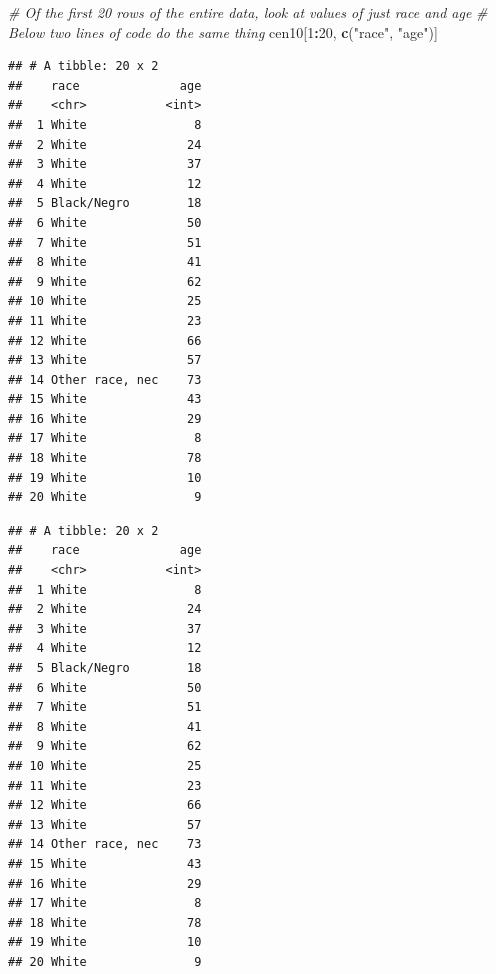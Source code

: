 \documentclass[]{book}
\newenvironment{Shaded}{\begin{snugshade}}{\end{snugshade}}
\newcommand{\CommentTok}[1]{\textcolor[rgb]{0.56,0.35,0.01}{\textit{#1}}}
\newcommand{\DecValTok}[1]{\textcolor[rgb]{0.00,0.00,0.81}{#1}}
\newcommand{\KeywordTok}[1]{\textcolor[rgb]{0.13,0.29,0.53}{\textbf{#1}}}
\newcommand{\NormalTok}[1]{#1}
\newcommand{\OperatorTok}[1]{\textcolor[rgb]{0.81,0.36,0.00}{\textbf{#1}}}
\newcommand{\StringTok}[1]{\textcolor[rgb]{0.31,0.60,0.02}{#1}}
\theoremstyle{definition}
\theoremstyle{definition}
\theoremstyle{definition}
\theoremstyle{remark}
\begin{document}
\begin{Shaded}
\begin{Highlighting}[]
\CommentTok{# Of the first 20 rows of the entire data, look at values of just race and age}
\CommentTok{# Below two lines of code do the same thing}
\NormalTok{cen10[}\DecValTok{1}\OperatorTok{:}\DecValTok{20}\NormalTok{, }\KeywordTok{c}\NormalTok{(}\StringTok{"race"}\NormalTok{, }\StringTok{"age"}\NormalTok{)]}
\end{Highlighting}
\end{Shaded}

\begin{verbatim}
## # A tibble: 20 x 2
##    race              age
##    <chr>           <int>
##  1 White               8
##  2 White              24
##  3 White              37
##  4 White              12
##  5 Black/Negro        18
##  6 White              50
##  7 White              51
##  8 White              41
##  9 White              62
## 10 White              25
## 11 White              23
## 12 White              66
## 13 White              57
## 14 Other race, nec    73
## 15 White              43
## 16 White              29
## 17 White               8
## 18 White              78
## 19 White              10
## 20 White               9
\end{verbatim}

\begin{Shaded}
\end{Shaded}

\begin{verbatim}
## # A tibble: 20 x 2
##    race              age
##    <chr>           <int>
##  1 White               8
##  2 White              24
##  3 White              37
##  4 White              12
##  5 Black/Negro        18
##  6 White              50
##  7 White              51
##  8 White              41
##  9 White              62
## 10 White              25
## 11 White              23
## 12 White              66
## 13 White              57
## 14 Other race, nec    73
## 15 White              43
## 16 White              29
## 17 White               8
## 18 White              78
## 19 White              10
## 20 White               9
\end{verbatim}
\end{document}
